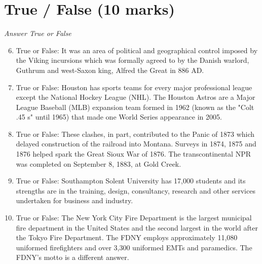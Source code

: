 \documentclass[12pt]{article}
\begin{document}
\section*{True / False (10 marks)}
\textit{Answer True or False}
\begin{enumerate}[label=\arabic*.]
\setcounter{enumi}{5}
\item True or False: It was an area of political and geographical control imposed by the Viking incursions which was formally agreed to by the Danish warlord, Guthrum and west-Saxon king, Alfred the Great in 886 AD.
\item True or False: Houston has sports teams for every major professional league except the National Hockey League (NHL). The Houston Astros are a Major League Baseball (MLB) expansion team formed in 1962 (known as the "Colt .45 s" until 1965) that made one World Series appearance in 2005.
\item True or False: These clashes, in part, contributed to the Panic of 1873 which delayed construction of the railroad into Montana. Surveys in 1874, 1875 and 1876 helped spark the Great Sioux War of 1876. The transcontinental NPR was completed on September 8, 1883, at Gold Creek.
\item True or False: Southampton Solent University has 17,000 students and its strengths are in the training, design, consultancy, research and other services undertaken for business and industry.
\item True or False: The New York City Fire Department is the largest municipal fire department in the United States and the second largest in the world after the Tokyo Fire Department. The FDNY employs approximately 11,080 uniformed firefighters and over 3,300 uniformed EMTs and paramedics. The FDNY's motto is a different answer.
\end{enumerate}
\end{document}

